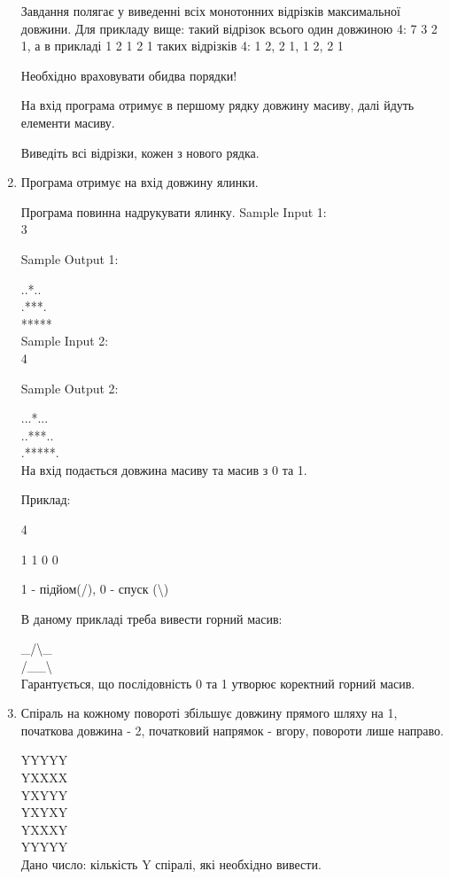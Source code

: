 \documentclass[]{article}
\begin{document}
\begin{enumerate}
Завдання полягає у виведенні всіх монотонних відрізків максимальної довжини.
Для прикладу вище: такий відрізок всього один довжиною 4: 7 3 2 1, а в
прикладі 1 2 1 2 1 таких відрізків 4: 1 2, 2 1, 1 2, 2 1

Необхідно враховувати обидва порядки!

На вхід програма отримує в першому рядку довжину масиву, далі йдуть елементи масиву.

Виведіть всі відрізки, кожен з нового рядка.

\item
Програма отримує на вхід довжину ялинки.

Програма повинна надрукувати ялинку.
Sample Input 1:\\

3

Sample Output 1:

..*..\\
.***.\\
*****\\

Sample Input 2:\\

4

Sample Output 2:

...*...\\
..***..\\
.*****.\\


На вхід подається довжина масиву та масив з 0 та 1.

Приклад:

4

1 1 0 0

1  - підйом(\slash), 0 - спуск (\textbackslash)

В даному прикладі треба вивести горний масив:

\_\slash \textbackslash\_ \\
\slash\_\_\textbackslash\\

Гарантується, що послідовність 0 та 1 утворює коректний горний масив.
\item
Спіраль на кожному повороті збільшує довжину прямого шляху на 1, початкова довжина - 2,
початковий напрямок - вгору, повороти лише направо.

YYYYY\\
YXXXX\\
YXYYY\\
YXYXY\\
YXXXY\\
YYYYY\\
Дано число: кількість Y спіралі, які необхідно вивести.


\end{enumerate}
\end{document}
